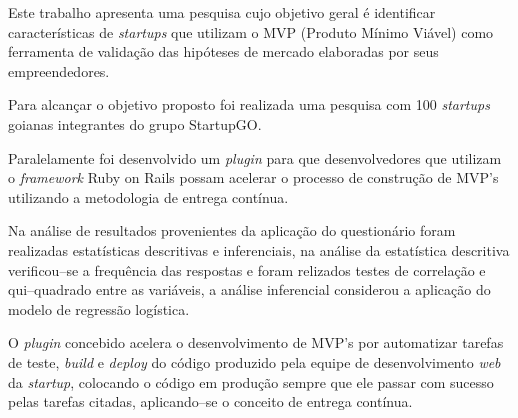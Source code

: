 
\begin{resumo} 

Este trabalho apresenta uma pesquisa cujo objetivo geral \'e identificar caracter\'isticas de \emph{startups} que utilizam o MVP (Produto M\'inimo Vi\'avel) como ferramenta de valida\c{c}\~ao das hip\'oteses de mercado elaboradas por seus empreendedores.

Para alcan\c{c}ar o objetivo proposto foi realizada uma pesquisa com 100 \emph{startups} goianas integrantes do grupo StartupGO.

Paralelamente foi desenvolvido um \emph{plugin} para que desenvolvedores que utilizam o \emph{framework} Ruby on Rails possam acelerar o processo de constru\c{c}\~ao de MVP's utilizando a metodologia de entrega cont\'inua.

Na an\'alise de resultados provenientes da aplica\c{c}\~ao do question\'ario foram realizadas estat\'isticas descritivas e inferenciais, na an\'alise da estat\'istica descritiva verificou--se a frequ\^encia das respostas e foram relizados testes de correla\c{c}\~ao e qui--quadrado entre as vari\'aveis, a an\'alise inferencial considerou a aplica\c{c}\~ao do modelo de regress\~ao log\'istica.

O \emph{plugin} concebido acelera o desenvolvimento de MVP's por automatizar tarefas de teste, \emph{build} e \emph{deploy} do c\'odigo produzido pela equipe de desenvolvimento \emph{web} da \emph{startup}, colocando o c\'odigo em produ\c{c}\~ao sempre que ele passar com sucesso pelas tarefas citadas, aplicando--se o conceito de entrega cont\'inua.

\end{resumo}

